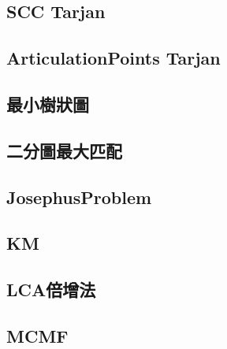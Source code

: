     \subsection{SCC Tarjan}
        
    \subsection{ArticulationPoints Tarjan}
        
    \subsection{最小樹狀圖}
        
    \subsection{二分圖最大匹配}
        
    \subsection{JosephusProblem}
        
    \subsection{KM}
        
    \subsection{LCA倍增法}
        
    \subsection{MCMF}
        
